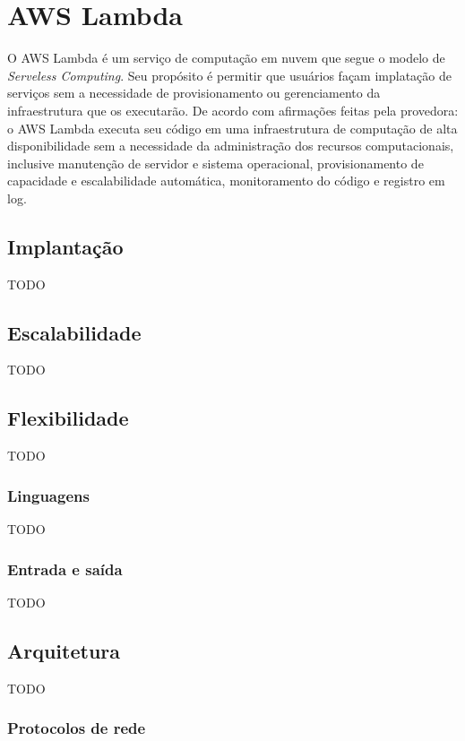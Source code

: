 \section{AWS Lambda}

O AWS Lambda é um serviço de computação em nuvem que segue o modelo de \textit{Serveless Computing}.
Seu propósito é permitir que usuários façam implatação de serviços sem a necessidade de provisionamento ou gerenciamento da infraestrutura que os executarão.
De acordo com afirmações feitas pela provedora:
o AWS Lambda executa seu código em uma infraestrutura de computação de alta disponibilidade sem a necessidade da administração dos recursos computacionais, inclusive manutenção de servidor e sistema operacional, provisionamento de capacidade e escalabilidade automática, monitoramento do código e registro em log.

\subsection{Implantação}

TODO

\subsection{Escalabilidade}

TODO

\subsection{Flexibilidade}

TODO

\subsubsection{Linguagens}

TODO

\subsubsection{Entrada e saída}

TODO

\subsection{Arquitetura}

TODO

\subsubsection{Protocolos de rede}

